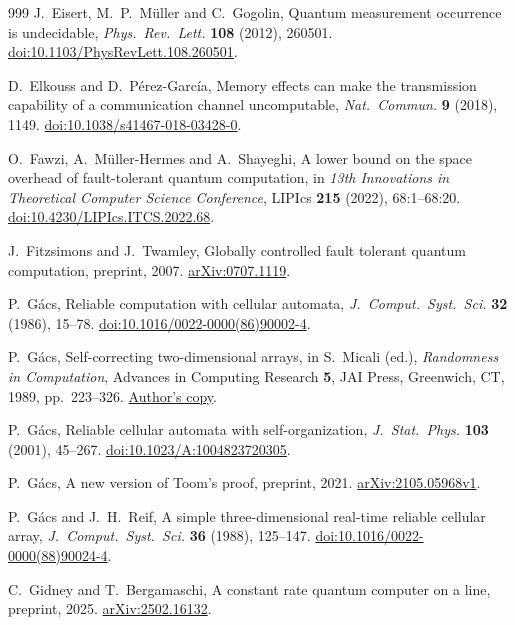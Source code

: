 \begin{thebibliography}{999}
J.~Eisert, M.~P.~M\"uller and C.~Gogolin,
Quantum measurement occurrence is undecidable,
\emph{Phys.~Rev.~Lett.} \textbf{108} (2012), 260501.
\href{https://doi.org/10.1103/PhysRevLett.108.260501}{doi:10.1103/PhysRevLett.108.260501}.

D.~Elkouss and D.~P\'erez-Garc\'ia,
Memory effects can make the transmission capability of a communication channel uncomputable,
\emph{Nat.~Commun.} \textbf{9} (2018), 1149.
\href{https://doi.org/10.1038/s41467-018-03428-0}{doi:10.1038/s41467-018-03428-0}.

O.~Fawzi, A.~M\"uller-Hermes and A.~Shayeghi,
A lower bound on the space overhead of fault-tolerant quantum computation,
in \emph{13th Innovations in Theoretical Computer Science Conference},
LIPIcs \textbf{215} (2022), 68:1--68:20.
\href{https://doi.org/10.4230/LIPIcs.ITCS.2022.68}{doi:10.4230/LIPIcs.ITCS.2022.68}.

J.~Fitzsimons and J.~Twamley,
Globally controlled fault tolerant quantum computation,
preprint, 2007.
\href{https://arxiv.org/abs/0707.1119}{arXiv:0707.1119}.

P.~G\'acs,
Reliable computation with cellular automata,
\emph{J.~Comput.~Syst.~Sci.} \textbf{32} (1986), 15--78.
\href{https://doi.org/10.1016/0022-0000(86)90002-4}{doi:10.1016/0022-0000(86)90002-4}.

P.~G\'acs,
Self-correcting two-dimensional arrays,
in S.~Micali (ed.), \emph{Randomness in Computation},
Advances in Computing Research \textbf{5},
JAI Press, Greenwich, CT, 1989, pp.~223--326.
\href{https://cs-web.bu.edu/faculty/gacs/papers/self-correcting-2d.pdf}{Author's copy}.

P.~G\'acs,
Reliable cellular automata with self-organization,
\emph{J.~Stat.~Phys.} \textbf{103} (2001), 45--267.
\href{https://doi.org/10.1023/A:1004823720305}{doi:10.1023/A:1004823720305}.

P.~G\'acs,
A new version of Toom's proof,
preprint, 2021.
\href{https://arxiv.org/abs/2105.05968v1}{arXiv:2105.05968v1}.

P.~G\'acs and J.~H.~Reif,
A simple three-dimensional real-time reliable cellular array,
\emph{J.~Comput.~Syst.~Sci.} \textbf{36} (1988), 125--147.
\href{https://doi.org/10.1016/0022-0000(88)90024-4}{doi:10.1016/0022-0000(88)90024-4}.

C.~Gidney and T.~Bergamaschi,
A constant rate quantum computer on a line,
preprint, 2025.
\href{https://arxiv.org/abs/2502.16132}{arXiv:2502.16132}.


\end{thebibliography}
